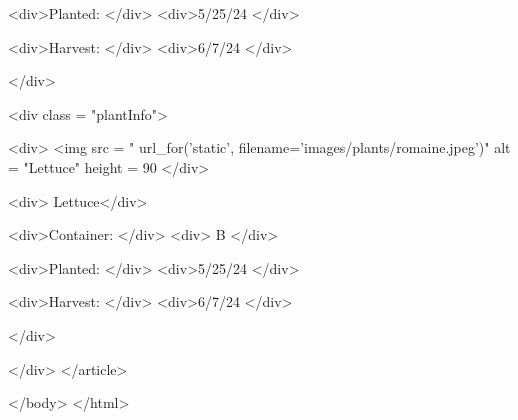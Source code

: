 \documentclass[12pt]{article} %
\begin{document}
\begin{htmlcode}[caption={Plant Page HTML}]
      <div>Planted: </div>
      <div>5/25/24 </div>

      <div>Harvest: </div>
      <div>6/7/24 </div>

     </div>

     <div class = "plantInfo">

      <div>
         <img src = "{{ url_for('static', filename='images/plants/romaine.jpeg')}}" alt = "Lettuce" height = 90%
      </div>
     
      <div> Lettuce</div>

      <div>Container: </div>
      <div> B </div>

      <div>Planted: </div>
      <div>5/25/24 </div>

      <div>Harvest: </div>
      <div>6/7/24 </div>

     </div>

    </div>
    </article> 

</body>
</html>

\end{htmlcode}

\pagebreak
\end{document}
